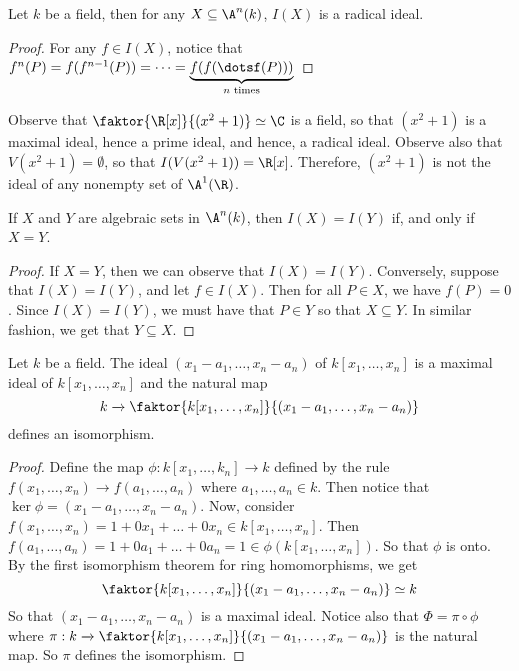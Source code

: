 \begin{proposition}\label{1.3.5}
    Let $k$ be a field, then for any $X \subseteq \A^n(k)$, $I(X)$ is a radical
    ideal.
\end{proposition}
\begin{proof}
    For any $f \in I(X)$, notice that $f^n(P)=f(f^{n-1}(P))=\dots=
    \underbrace{f(f(\dotsf(P)))}_{n\text{ times}}$
\end{proof}

\begin{example}\label{example_1.8}
    Observe that $\faktor{\R[x]}{(x^2+1)} \simeq \C$ is a field, so that
    $(x^2+1)$ is a maximal ideal, hence a prime ideal, and hence, a radical
    ideal. Observe also that $V(x^2+1)=\emptyset$, so that $I(V(x^2+1))=\R[x]$.
    Therefore, $(x^2+1)$ is not the ideal of any nonempty set of $\A^1(\R)$.
\end{example}

\begin{proposition}\label{1.3.6}
    If $X$ and $Y$ are algebraic sets in $\A^n(k)$, then $I(X)=I(Y)$ if, and
    only if $X=Y$.
\end{proposition}
\begin{proof}
    If $X=Y$, then we can observe that $I(X)=I(Y)$. Conversely, suppose that
    $I(X)=I(Y)$, and let $f \in I(X)$. Then for all $P \in X$, we have $f(P)=0$.
    Since $I(X)=I(Y)$, we must have that $P \in Y$ so that $X \subseteq Y$. In
    similar fashion, we get that $Y \subseteq X$.
\end{proof}

\begin{theorem}\label{1.3.7}
    Let $k$ be a field. The ideal $(x_1-a_1, \dots, x_n-a_n)$ of
    $k[x_1, \dots, x_n]$ is a maximal ideal of $k[x_1, \dots, x_n]$ and the
    natural map
    \begin{equation*}
        k \xrightarrow{} \faktor{k[x_1, \dots, x_n]}{(x_1-a_1, \dots, x_n-a_n)}
    \end{equation*}
    defines an isomorphism.
\end{theorem}
\begin{proof}
    Define the map $\phi:k[x_1, \dots, k_n] \xrightarrow{} k$ defined by the
    rule $f(x_1, \dots, x_n) \xrightarrow{} f(a_1, \dots, a_n)$ where $a_1,
    \dots, a_n \in k$. Then notice that $\ker{\phi}=(x_1-a_1, \dots ,x_n-a_n)$.
    Now, consider $f(x_1, \dots, x_n)=1+0x_1+\dots+0x_n \in k[x_1, \dots, x_n]$.
    Then $f(a_1,\dots,a_n)=1+0a_1+\dots+0a_n=1 \in \phi(k[x_1, \dots, x_n])$. So
    that $\phi$ is onto. By the first isomorphism theorem for ring
    homomorphisms, we get
    \begin{equation*}
        \faktor{k[x_1, \dots, x_n]}{(x_1-a_1, \dots, x_n-a_n)} \simeq k
    \end{equation*}
    So that $(x_1-a_1, \dots, x_n-a_n)$ is a maximal ideal. Notice also that
    $\Phi=\pi \circ \phi$ where $\pi:k \xrightarrow{}
    \faktor{k[x_1, \dots, x_n]}{(x_1-a_1, \dots, x_n-a_n)}$ is the natural map.
    So $\pi$ defines the isomorphism.
\end{proof}
